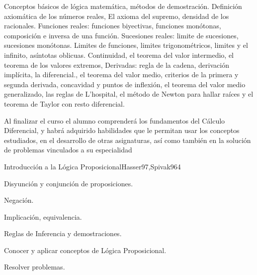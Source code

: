 \begin{syllabus}


\begin{justification}
Conceptos básicos de lógica matemática, métodos de demostración. Definición axiomática de los números reales, El axioma del supremo, densidad de los racionales. Funciones reales: funciones biyectivas, funciones monótonas, composición e inversa de una función. Sucesiones reales: limite de sucesiones, sucesiones monótonas.  Limites de funciones, limites trigonométricos, limites y el infinito, asíntotas  oblicuas. Continuidad, el teorema del valor intermedio, el teorema de los valores extremos, Derivadas: regla de la cadena, derivación implícita, la diferencial., el teorema del valor medio, criterios de la primera y segunda derivada, concavidad y puntos de inflexión, el teorema del valor medio generalizado, las reglas de L'hospital, el método de Newton para hallar raíces y el  teorema de Taylor  con resto diferencial.
\end{justification}

\begin{goals}
\item Al finalizar el curso el alumno comprenderá los fundamentos del Cálculo Diferencial, y habrá adquirido habilidades que le permitan usar los conceptos estudiados, en el desarrollo de otras asignaturas, así como también en la solución de problemas vinculados a su especialidad 
\end{goals}

\begin{outcomes}
\end{outcomes}

\begin{unit}{Introducción a la Lógica Proposicional}{Hasser97,Spivak96}{4}
\begin{topics}
      \item Disyunción y conjunción de proposiciones.
      \item Negación.
      \item Implicación, equivalencia.
      \item Reglas de Inferencia y demostraciones.
   \end{topics}

   \begin{unitgoals}
      \item Conocer y aplicar conceptos de Lógica Proposicional.
	\item Resolver problemas.
   \end{unitgoals}
\end{unit}


\end{syllabus}
